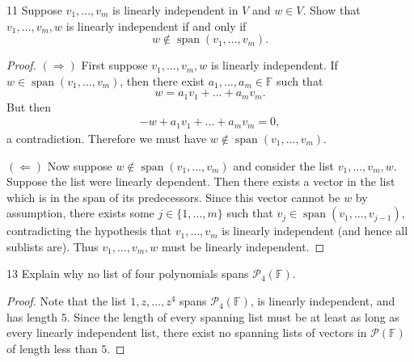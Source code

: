 \documentclass{extarticle}
\newenvironment{problem}[1]{\begin{prob*}{#1}{}}{\end{prob*}}
\newcommand{\F}{\mathbb{F}}
\DeclareMathOperator{\Span}{span}
\begin{document}
\begin{problem}{11}
Suppose $v_1,\dots, v_m$ is linearly independent in $V$ and $w\in V$.  Show that $v_1,\dots, v_m, w$ is linearly independent if and only if 
\begin{equation*}
w\not\in\Span(v_1,\dots,v_m).
\end{equation*}
\end{problem}
\begin{proof}
$(\Rightarrow)$ First suppose $v_1,\dots, v_m, w$ is linearly independent.  If $w\in\Span(v_1,\dots,v_m)$, then there exist $a_1,\dots, a_m\in\F$ such that
\begin{equation*}
w = a_1v_1 + \dots + a_mv_m.
\end{equation*}
But then 
\begin{align*}
-w + a_1v_1 + \dots + a_mv_m = 0,
\end{align*}
a contradiction.  Therefore we must have $w\not\in\Span(v_1,\dots,v_m)$.
\par $(\Leftarrow)$ Now suppose $w\not\in\Span(v_1,\dots, v_m)$ and consider the list $v_1,\dots,v_m, w$.  Suppose the list were linearly dependent.  Then there exists a vector in the list which is in the span of its predecessors.  Since this vector cannot be $w$ by assumption, there exists some $j\in\{1,\dots, m\}$ such that $v_j\in\Span(v_1,\dots, v_{j-1})$, contradicting the hypothesis that $v_1,\dots, v_m$ is linearly independent (and hence all sublists are).  Thus $v_1,\dots, v_m, w$ must be linearly independent.
\end{proof}

\begin{problem}{13}
Explain why no list of four polynomials spans $\mathcal{P}_4(\F)$.
\end{problem}
\begin{proof}
Note that the list $1, z, \dots, z^4$ spans $\mathcal{P}_4(\F)$, is linearly independent, and has length $5$.  Since the length of every spanning list must be at least as long as every linearly independent list, there exist no spanning lists of vectors in $\mathcal{P}(\F)$ of length less than $5$.
\end{proof}
\end{document}
